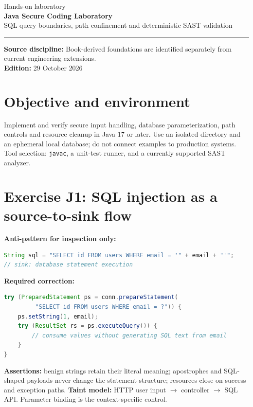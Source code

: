 \documentclass[10pt,letterpaper]{article}
\begin{document}
\hypersetup{pageanchor=false}%
\begin{titlepage}
\vspace*{1.0in}
{\color{bluegray}\Large Hands-on laboratory}\\[1.0em]
{\color{navy}\Huge\bfseries Java Secure Coding Laboratory}\\[0.7em]
{\Large SQL query boundaries, path confinement and deterministic SAST validation}\\[2.0em]
\rule{\linewidth}{1.0pt}
\vfill
\textbf{Source discipline:} Book-derived foundations are identified separately from current engineering extensions.\\
\textbf{Edition:} 29 October 2026
\end{titlepage}\hypersetup{pageanchor=true}
\tableofcontents
\clearpage
\section{Objective and environment}
Implement and verify secure input handling, database parameterization, path controls and resource cleanup in Java 17 or later. Use an isolated directory and an ephemeral local database; do not connect examples to production systems. Tool selection: \texttt{javac}, a unit-test runner, and a currently supported SAST analyzer.
\section{Exercise J1: SQL injection as a source-to-sink flow}
\textbf{Anti-pattern for inspection only:}
\begin{lstlisting}[language=Java]
String sql = "SELECT id FROM users WHERE email = '" + email + "'";
// sink: database statement execution
\end{lstlisting}
\textbf{Required correction:}
\begin{lstlisting}[language=Java]
try (PreparedStatement ps = conn.prepareStatement(
         "SELECT id FROM users WHERE email = ?")) {
    ps.setString(1, email);
    try (ResultSet rs = ps.executeQuery()) {
        // consume values without generating SQL text from email
    }
}
\end{lstlisting}
\textbf{Assertions:} benign strings retain their literal meaning; apostrophes and SQL-shaped payloads never change the statement structure; resources close on success and exception paths. \textbf{Taint model:} HTTP user input \(\rightarrow\) controller \(\rightarrow\) SQL API. Parameter binding is the context-specific control.
\end{document}
